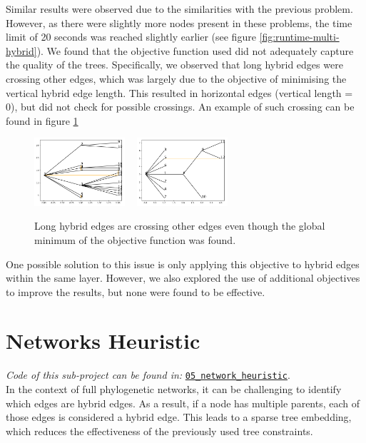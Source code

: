 \documentclass{article}
\begin{document}
Similar results were observed due to the similarities with the previous problem. However, as there were slightly more nodes present in these problems, the time limit of 20 seconds was reached slightly earlier (see figure \ref{fig:runtime-multi-hybrid}).
We found that the objective function used did not adequately capture the quality of the trees. Specifically, we observed that long hybrid edges were crossing other edges, which was largely due to the objective of minimising the vertical hybrid edge length. This resulted in horizontal edges (vertical length = 0), but did not check for possible crossings. An example of such crossing can be found in figure \ref{fig:long_edges}
\begin{figure}[H]
    \centering
    \includegraphics[width=0.3\textwidth]{figures/long_edge.pdf} ~
    \includegraphics[width=0.3\textwidth]{figures/long_edge_2.pdf}
    \caption{Long hybrid edges are crossing other edges even though the global minimum of the objective function was found.} 
    \label{fig:long_edges}
\end{figure}

One possible solution to this issue is only applying this objective to hybrid edges within the same layer. However, we also explored the use of additional objectives to improve the results, but none were found to be effective.
\newpage
\section*{Networks Heuristic}
\textit{Code of this sub-project can be found in: }\href{https://github.com/not-a-feature/Layouting-Phylogenetic-Networks-using-MIQP/tree/main/05_network_heuristic}{\texttt{05\_network\_heuristic}}.\\
In the context of full phylogenetic networks, it can be challenging to identify which edges are hybrid edges. As a result, if a node has multiple parents, each of those edges is considered a hybrid edge. This leads to a sparse tree embedding, which reduces the effectiveness of the previously used tree constraints.
\end{document}
